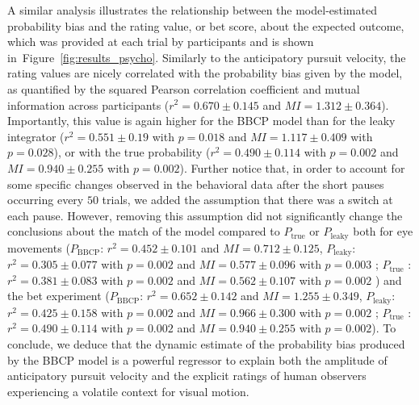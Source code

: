 \documentclass[10pt,letterpaper]{article}
\newcommand{\seeFig}[1]{Figure~\ref{fig:#1}}
\begin{document}
A similar analysis
illustrates the relationship between
the model-estimated probability bias
and the rating value, or bet score, about the expected outcome, which was provided at each trial
by participants
and is shown in~\seeFig{results_psycho}.
Similarly to the anticipatory pursuit velocity, the rating values are nicely correlated
with the probability bias given by the model,
as quantified by the squared Pearson correlation coefficient and mutual information
across participants ($r^{2} = 0.670 \pm 0.145$ and $MI = 1.312 \pm 0.364$).
Importantly, this value is again higher for the BBCP model than
for the leaky integrator ($r^{2} = 0.551 \pm 0.19$ with $p=0.018$ and $MI = 1.117 \pm 0.409$ with $p=0.028$),
or with the true probability ($r^{2} = 0.490 \pm 0.114$ with $p=0.002$ and $MI = 0.940 \pm 0.255$ with $p=0.002$).
Further notice that, in order to account for some specific changes
observed in the behavioral data after the short pauses
occurring every $50$ trials,
we added the assumption %
that there was a switch at each pause.
However, removing this assumption did not significantly change the conclusions about the match of the model
compared to $P_{\text{true}}$ or $P_{\text{leaky}}$
both for eye movements
($P_{\text{BBCP}}$: $r^{2} = 0.452 \pm 0.101$ and $MI =  0.712 \pm 0.125$,
$P_{\text{leaky}}$: $r^{2} = 0.305 \pm 0.077$ with $p=0.002$ and $MI =  0.577 \pm 0.096$ with $p=0.003$ ;
$P_{\text{true}}$ : $r^{2} = 0.381 \pm 0.083$ with $p=0.002$ and %
$MI =  0.562 \pm 0.107$ with $p=0.002$ )
and the bet experiment
($P_{\text{BBCP}}$: $r^{2} = 0.652 \pm 0.142$ and $MI =  1.255 \pm 0.349$, $P_{\text{leaky}}$: $r^{2} = 0.425 \pm 0.158$ with $p=0.002$ and $MI =  0.966 \pm 0.300$ with $p=0.002$ ; $P_{\text{true}}$ : $r^{2} = 0.490 \pm 0.114$ with $p=0.002$ and $MI =  0.940 \pm 0.255$ with $p=0.002$).
To conclude, we deduce that the dynamic estimate of the probability bias produced by the BBCP model
is a powerful regressor to explain
both the amplitude of anticipatory pursuit velocity
and the explicit ratings of human observers
experiencing a volatile context for visual motion.

\end{document}
